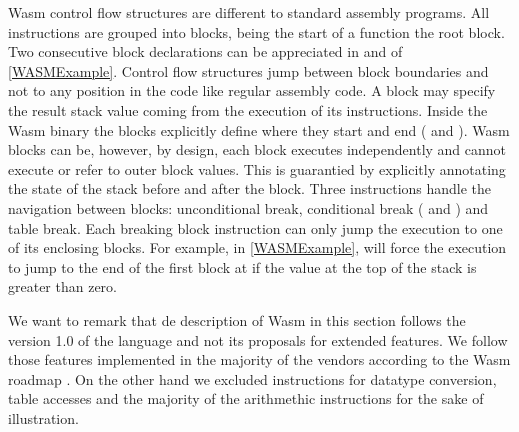 Wasm control flow structures are different to standard assembly programs. All instructions are grouped into blocks, being the start of a function the root block. Two consecutive block declarations can be appreciated in  and  of \autoref{WASMExample}. Control flow structures jump between block boundaries and not to any position in the code like regular assembly code. A block may specify the result stack value coming from the execution of its instructions. Inside the Wasm binary the blocks explicitly define where they start and end ( and ). Wasm blocks can be, however, by design, each block executes independently and cannot execute or refer to outer block values. This is guarantied by explicitly annotating the state of the stack before and after the block. Three instructions handle the navigation between blocks: unconditional break, conditional break ( and ) and table break. Each breaking block instruction can only jump the execution to one of its enclosing blocks. For example, in \autoref{WASMExample},  will force the execution to jump to the end of the first block at  if the value at the top of the stack is greater than zero.

We want to remark that de description of Wasm in this section follows the version 1.0 of the language and not its proposals for extended features. We follow those features implemented in the majority of the vendors according to the Wasm roadmap \cite{wasm_roadmap}. On the other hand we excluded instructions for datatype conversion, table accesses and the majority of the arithmethic instructions for the sake of illustration.







